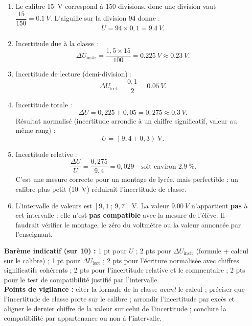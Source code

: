 \documentclass[11pt]{article}
\begin{document}
\begin{corrige}
\begin{enumerate}
\item Le calibre \SI{15}{V} correspond à 150 divisions, donc une division vaut $\dfrac{15}{150} = \SI{0,1}{V}$. L'aiguille sur la division 94 donne :
\[ U = 94 \times 0{,}1 = \SI{9,4}{V}. \]
\item Incertitude due à la classe :
\[ \Delta U_{\text{instr}} = \frac{1{,}5 \times 15}{100} = \SI{0,225}{V} \approx \SI{0,23}{V}. \]
\item Incertitude de lecture (demi-division) :
\[ \Delta U_{\text{lect}} = \frac{0{,}1}{2} = \SI{0,05}{V}. \]
\item Incertitude totale :
\[ \Delta U = 0{,}225 + 0{,}05 = 0{,}275 \approx \SI{0,3}{V}. \]
Résultat normalisé (incertitude arrondie à un chiffre significatif, valeur au même rang) :
\[ \boxed{U = (9{,}4 \pm 0{,}3)~\text{V}}. \]
\item Incertitude relative :
\[ \frac{\Delta U}{U} = \frac{0{,}275}{9{,}4} = 0{,}029 \quad \text{soit environ } \SI{2,9}{\%}. \]
C'est une mesure correcte pour un montage de lycée, mais perfectible : un calibre plus petit (\SI{10}{V}) réduirait l'incertitude de classe.
\item L'intervalle de valeurs est $[9{,}1 \ ;\ 9{,}7]$ V. La valeur $\SI{9,00}{V}$ n'appartient \textbf{pas} à cet intervalle : elle n'est \textbf{pas compatible} avec la mesure de l'élève. Il faudrait vérifier le montage, le zéro du voltmètre ou la valeur annoncée par l'enseignant.
\end{enumerate}
\textbf{Barème indicatif (sur 10) :} 1 pt pour $U$ ; 2 pts pour $\Delta U_{\text{instr}}$ (formule + calcul sur le calibre) ; 1 pt pour $\Delta U_{\text{lect}}$ ; 2 pts pour l'écriture normalisée avec chiffres significatifs cohérents ; 2 pts pour l'incertitude relative et le commentaire ; 2 pts pour le test de compatibilité justifié par l'intervalle.\\
\textbf{Points de vigilance :} citer la formule de la classe \emph{avant} le calcul ; préciser que l'incertitude de classe porte sur le calibre ; arrondir l'incertitude par excès et aligner le dernier chiffre de la valeur sur celui de l'incertitude ; conclure la compatibilité par appartenance ou non à l'intervalle.
\end{corrige}
\end{document}
